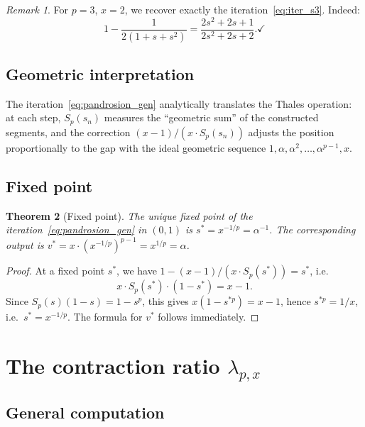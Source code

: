 \documentclass[10pt,a4paper,oneside]{book}
\newtheorem{theorem}{Theorem}[chapter]
\theoremstyle{definition}
\theoremstyle{remark}
\newtheorem{remark}[theorem]{Remark}
\begin{document}
\begin{remark}
For $p = 3$, $x = 2$, we recover exactly the iteration~\eqref{eq:iter_s3}. Indeed:
\[
  1 - \frac{1}{2(1+s+s^2)} = \frac{2s^2+2s+1}{2s^2+2s+2}. \checkmark
\]
\end{remark}

\subsection{Geometric interpretation}

The iteration~\eqref{eq:pandrosion_gen} analytically translates the Thales operation: at each step, $S_p(s_n)$ measures the ``geometric sum'' of the constructed segments, and the correction $(x-1)/(x \cdot S_p(s_n))$ adjusts the position proportionally to the gap with the ideal geometric sequence $1, \alpha, \alpha^2, \ldots, \alpha^{p-1}, x$.

\subsection{Fixed point}

\begin{theorem}[Fixed point]
\label{thm:fixed_point}
The unique fixed point of the iteration~\eqref{eq:pandrosion_gen} in $(0,1)$ is $s^* = x^{-1/p} = \alpha^{-1}$. The corresponding output is $v^* = x \cdot (x^{-1/p})^{p-1} = x^{1/p} = \alpha$.
\end{theorem}

\begin{proof}
At a fixed point $s^*$, we have $1 - (x-1)/(x \cdot S_p(s^*)) = s^*$, i.e.\
\[
  x \cdot S_p(s^*) \cdot (1 - s^*) = x - 1.
\]
Since $S_p(s)(1-s) = 1 - s^p$, this gives $x(1 - s^{*p}) = x - 1$, hence $s^{*p} = 1/x$, i.e.\ $s^* = x^{-1/p}$. The formula for $v^*$ follows immediately.
\end{proof}

\section{The contraction ratio \texorpdfstring{$\lambda_{p,x}$}{lambda}}
\label{sec:coefficient}

\subsection{General computation}
\end{document}
